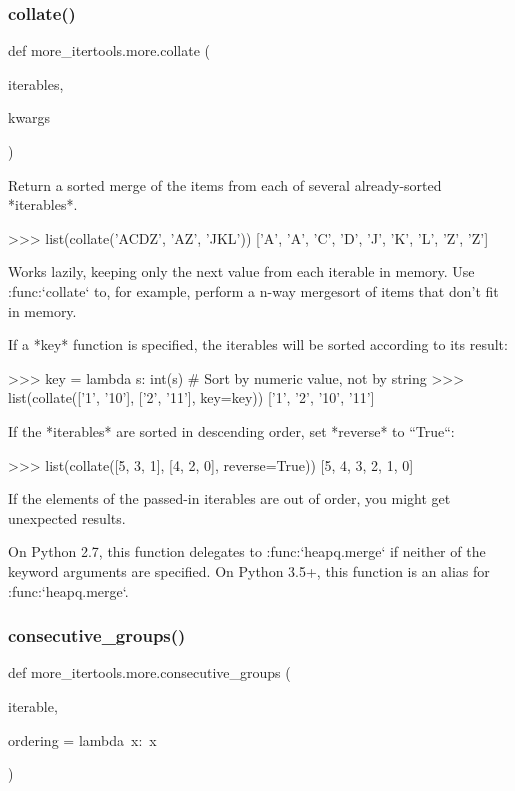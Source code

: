 \subsubsection{\texorpdfstring{collate()}{collate()}}
{\footnotesize\ttfamily def more\+\_\+itertools.\+more.\+collate (\begin{DoxyParamCaption}\item[{}]{iterables,  }\item[{}]{kwargs }\end{DoxyParamCaption})}

\begin{DoxyVerb}Return a sorted merge of the items from each of several already-sorted
*iterables*.

    >>> list(collate('ACDZ', 'AZ', 'JKL'))
    ['A', 'A', 'C', 'D', 'J', 'K', 'L', 'Z', 'Z']

Works lazily, keeping only the next value from each iterable in memory. Use
:func:`collate` to, for example, perform a n-way mergesort of items that
don't fit in memory.

If a *key* function is specified, the iterables will be sorted according
to its result:

    >>> key = lambda s: int(s)  # Sort by numeric value, not by string
    >>> list(collate(['1', '10'], ['2', '11'], key=key))
    ['1', '2', '10', '11']


If the *iterables* are sorted in descending order, set *reverse* to
``True``:

    >>> list(collate([5, 3, 1], [4, 2, 0], reverse=True))
    [5, 4, 3, 2, 1, 0]

If the elements of the passed-in iterables are out of order, you might get
unexpected results.

On Python 2.7, this function delegates to :func:`heapq.merge` if neither
of the keyword arguments are specified. On Python 3.5+, this function
is an alias for :func:`heapq.merge`.\end{DoxyVerb}
 \mbox{\label{namespacemore__itertools_1_1more_ab8a744987f80e38d4224517f0a5e97f0}} 
\subsubsection{\texorpdfstring{consecutive\+\_\+groups()}{consecutive\_groups()}}
{\footnotesize\ttfamily def more\+\_\+itertools.\+more.\+consecutive\+\_\+groups (\begin{DoxyParamCaption}\item[{}]{iterable,  }\item[{}]{ordering = {\ttfamily lambda~x\+:~x} }\end{DoxyParamCaption})}

